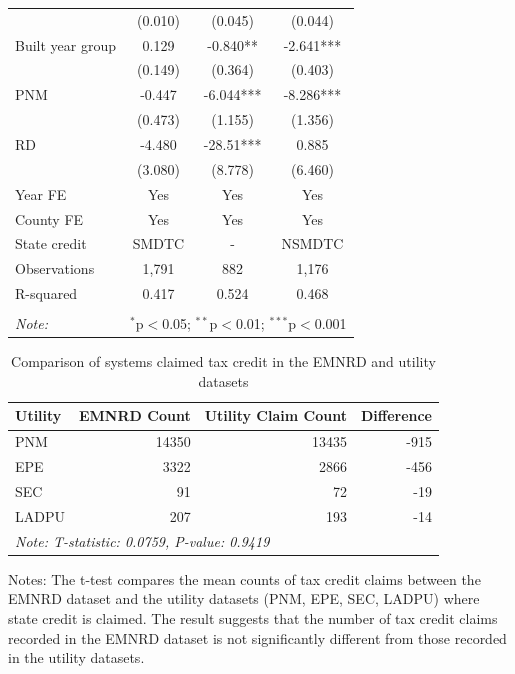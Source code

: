 \documentclass[12pt,twoside,letterpaper]{article}
\begin{document}
\begin{table}[H]
{\begin{tabular}{lccc}
 & (0.010) & (0.045) & (0.044) \\
Built year group & 0.129 & -0.840** & -2.641*** \\
 & (0.149) & (0.364) & (0.403) \\
PNM & -0.447 & -6.044*** & -8.286*** \\
 & (0.473) & (1.155) & (1.356) \\
RD & -4.480 & -28.51*** & 0.885 \\
 & (3.080) & (8.778) & (6.460) \\ \cline{1-4}
Year FE & Yes & Yes & Yes \\
County FE & Yes & Yes & Yes \\
State credit & SMDTC & - & NSMDTC \\
Observations & 1,791 & 882 & 1,176 \\
R-squared & 0.417 & 0.524 & 0.468 \\ 
\hline
\hline \\[-1.8ex]
\textit{Note:} & \multicolumn{3}{r}{$^{*}$p$<$0.05; $^{**}$p$<$0.01; $^{***}$p$<$0.001} \\
\end{tabular}}
\end{table}



\begin{table}[H] 
\caption{Comparison of systems claimed tax credit in the EMNRD and utility datasets}
\label{tab:compare_emnrd_utility}
\centering
\begin{tabular}{lrrr}
\toprule
Utility & EMNRD Count & Utility Claim Count & Difference \\
\midrule
PNM & 14350 & 13435 & -915 \\
EPE & 3322 & 2866 & -456 \\
SEC & 91 & 72 & -19 \\
LADPU & 207 & 193 & -14 \\
\bottomrule
\multicolumn{4}{l}{\textit{Note:  T-statistic: 0.0759, P-value: 0.9419}} \\
\end{tabular}


\begin{flushleft}\footnotesize{Notes: The t-test compares the mean counts of tax credit claims between the EMNRD dataset and the utility datasets (PNM, EPE, SEC, LADPU) where state credit is claimed. The result suggests that the number of tax credit claims recorded in the EMNRD dataset is not significantly different from those recorded in the utility datasets.}
\end{flushleft}
\end{table}
\end{document}
